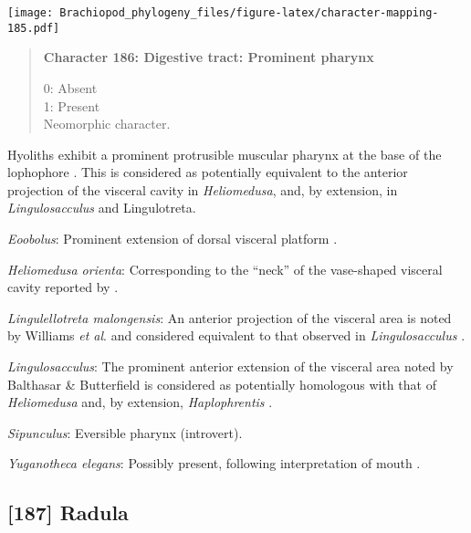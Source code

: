 \documentclass[openany]{book}
\theoremstyle{definition}
\theoremstyle{definition}
\theoremstyle{definition}
\theoremstyle{remark}
\begin{document}
\texttt{[image: Brachiopod\_phylogeny\_files/figure-latex/character-mapping-185.pdf]}

\begin{quote}
\textbf{Character 186: Digestive tract: Prominent pharynx}

0: Absent\\
1: Present\\
Neomorphic character.
\end{quote}

Hyoliths exhibit a prominent protrusible muscular pharynx at the base of
the lophophore \citep{Moysiuk2017Hyolithsare}. This is considered as
potentially equivalent to the anterior projection of the visceral cavity
in \emph{Heliomedusa}, and, by extension, in \emph{Lingulosacculus} and
Lingulotreta.

\hypertarget{Eoobolus-coding-186}{}
\emph{Eoobolus}: Prominent extension of dorsal visceral platform
\citep{Balthasar2009Thebrachiopod}.

\hypertarget{Heliomedusa_orienta-coding-186}{}
\emph{Heliomedusa orienta}: Corresponding to the ``neck'' of the
vase-shaped visceral cavity reported by
\citet{Zhang2009Architectureand}.

\hypertarget{Lingulellotreta_malongensis-coding-186}{}
\emph{Lingulellotreta malongensis}: An anterior projection of the
visceral area is noted by Williams \emph{et al}.
\citeyearpar{Williams2000LinguliformeaCraniiformea} and considered
equivalent to that observed in \emph{Lingulosacculus}
\citep{Balthasar2009EarlyCambrian}.

\hypertarget{Lingulosacculus-coding-186}{}
\emph{Lingulosacculus}: The prominent anterior extension of the visceral
area noted by Balthasar \& Butterfield
\citeyearpar{Balthasar2009EarlyCambrian} is considered as potentially
homologous with that of \emph{Heliomedusa}
\citep{Zhang2009Architectureand} and, by extension, \emph{Haplophrentis}
\citep{Moysiuk2017Hyolithsare}.

\hypertarget{Sipunculus-coding-186}{}
\emph{Sipunculus}: Eversible pharynx (introvert).

\hypertarget{Yuganotheca_elegans-coding-186}{}
\emph{Yuganotheca elegans}: Possibly present, following interpretation
of mouth \citep[see fig. 2c, d in][]{Zhang2014Anearly}.

\subsection*{{[}187{]} Radula}\label{radula}
\end{document}
